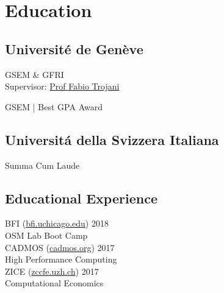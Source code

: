 \documentclass[]{deedy-resume-openfont}
\begin{document}
%
%
\lastupdated

%
%



%
%

\begin{minipage}[t]{0.33\textwidth} 


\section{Education} 

\subsection{Universit\'e de Gen\`eve}
GSEM \& GFRI \\
Supervisor: \href{http://www.people.usi.ch/trojanif/}{Prof Fabio Trojani} \\
\sectionsep

GSEM | Best GPA Award \\
\sectionsep

\subsection{Universit\'a della Svizzera Italiana}
Summa Cum Laude
\sectionsep

\subsection{Educational Experience}
\textbullet{} BFI (\href{https://bfi.uchicago.edu/osm18}{bfi.uchicago.edu}) 2018 \\
OSM Lab Boot Camp \\
\textbullet{} CADMOS (\href{http://cadmos.org/index.php/fr/}{cadmos.org}) 2017 \\
High Performance Computing \\
\textbullet{} ZICE (\href{http://zccfe.uzh.ch/en/}{zccfe.uzh.ch}) 2017 \\
Computational Economics 
\sectionsep


\end{minipage}
\end{document}
